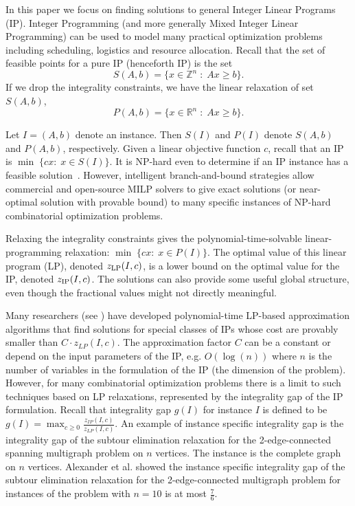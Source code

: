In this paper we focus on finding solutions to general Integer Linear Programs (IP). Integer Programming (and more generally Mixed Integer Linear Programming) can be used to model many practical optimization problems including scheduling, logistics and resource allocation. Recall that the set of feasible points for a pure IP (henceforth IP) is the set
\begin{equation}
S(A,b)= \{x\in \mathbb{Z}^{n}\;:\; Ax\geq b\}  \label{S}.
\end{equation}
If we drop the integrality constraints, we have the linear relaxation of set $S(A,b)$,
\begin{equation}
P(A,b) = \{x\in \mathbb{R}^{n}\;:\; Ax\geq b\}. \label{P}
\end{equation}

Let $I=(A,b)$ denote an instance. Then $S(I)$ and $P(I)$ denote $S(A,b)$ and $P(A,b)$, respectively. Given a linear objective function $c$, recall that an IP is $\min \;\{cx:\; x \in S(I)\}$. It is  NP-hard even to determine if an IP instance has a feasible solution~\cite{GareyJohnson}. However, intelligent branch-and-bound strategies allow commercial and open-source MILP solvers to give exact solutions (or near-optimal solution with provable bound) to many specific instances of NP-hard combinatorial optimization problems. 

Relaxing the integrality constraints gives the polynomial-time-solvable linear-programming relaxation: $\min \;\{cx:\;x\in P(I) \}$.  The optimal value of this linear program (LP), denoted $z_{\operatorname{LP}}(I,c)$, is a lower bound on the optimal value for the IP, denoted $z_{\operatorname{IP}}(I,c)$. The solutions can also provide some useful global structure, even though the fractional values might not directly meaningful. 

Many researchers (see \cite{davids,vazirani}) have developed polynomial-time LP-based approximation algorithms that find solutions for special classes of IPs whose cost are provably smaller than $C\cdot z_{LP}(I,c)$. The approximation factor $C$ can be a constant or depend on the input parameters of the IP, e.g. $O(\log(n))$ where $n$ is the number of variables in the formulation of the IP (the dimension of the problem). However, for many combinatorial optimization problems there is a limit to such techniques based on LP relaxations, represented  by the {integrality gap} of the IP formulation. Recall that integrality gap $g(I)$ for instance $I$ is defined to be $g(I)= \max_{c\geq 0}\frac{z_{IP}(I,c)}{z_{LP}(I,c)}$. An example of instance specific integrality gap is the integrality gap of the subtour elimination relaxation for the 2-edge-connected spanning multigraph problem on $n$ vertices. The instance is the complete graph on $n$ vertices. Alexander et al. \cite{alexander2006integrality} showed the instance specific integrality gap of the subtour elimination relaxation for the 2-edge-connected multigraph problem for instances of the problem with $n= 10$ is at most $\frac{7}{6}$.

